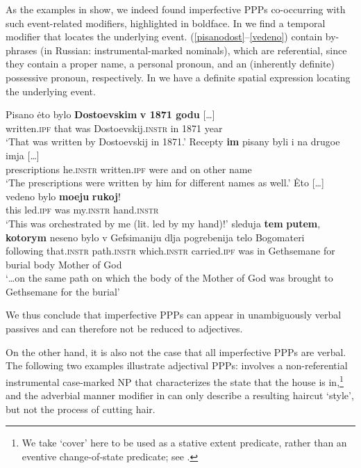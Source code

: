 \documentclass[output=paper,modfonts,newtxmath,hidelinks
]{langscibook}
\begin{document}
As the examples in  show, we indeed found imperfective PPPs co-occurring with such event-related modifiers, highlighted in boldface. In  we find a temporal modifier that locates the underlying event. (\ref{pisanodost}--\ref{vedeno}) contain by-phrases (in Russian: instrumental-marked nominals), which are referential, since they contain a proper name, a personal pronoun, and an (inherently definite) possessive pronoun, respectively. In  we have a definite spatial expression locating the underlying event.

\ea\label{pisano}
\ea\gll	Pisano \.{e}to bylo \textbf{Dostoevskim} \textbf{v 1871 godu} [\dots]\\ 
	written.\textsc{ipf} that was Dostoevskij.\textsc{instr} {in 1871 year} \\
\glt	`That was written by Dostoevskij in 1871.'\label{pisanodost}
\ex\gll	Recepty \textbf{im} pisany byli i na drugoe imja [\dots]\\ 
	prescriptions he.\textsc{instr} written.\textsc{ipf} were and on other name \\ 
\glt	`The prescriptions were written by him for different names as well.'\label{pisanoim}
\ex\gll 	\.{E}to [\dots] vedeno bylo \textbf{moeju} \textbf{rukoj}!\\
	this {} led.\textsc{ipf} was my.\textsc{instr} hand.\textsc{instr}\\
\glt	`This was orchestrated by me (lit. led by my hand)!'\label{vedeno} 
\ex\gll	[\dots] sleduja \textbf{tem} \textbf{putem}, \textbf{kotorym} neseno bylo v Gefsimaniju dlja pogrebenija telo Bogomateri\\
	{} following that.\textsc{instr} path.\textsc{instr} which.\textsc{instr} carried.\textsc{ipf} was in Gethsemane for burial body {Mother of God} \\
\glt	`\dots on the same path on which the body of the Mother of God was brought to Gethsemane for the burial'\label{Sion}
\z\z

\noindent We thus conclude that imperfective PPPs can appear in unambiguously verbal passives and can therefore not be reduced to adjectives. 

On the other hand, it is also not the case that all imperfective PPPs are verbal. The following two examples illustrate adjectival PPPs:  involves a non-referential instrumental case-marked NP that characterizes the state that the house is in,\footnote{We take `cover' here to be used as a stative extent predicate, rather than an eventive change-of-state predicate; see \citet{gawron09}.} and the adverbial manner modifier in  can only describe a resulting haircut `style', but not the process of cutting hair.
\end{document}
